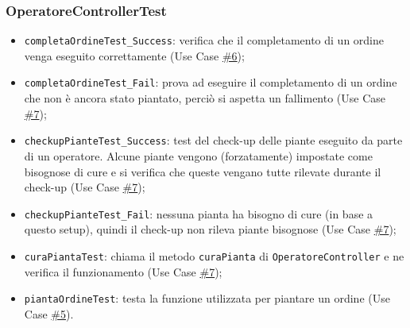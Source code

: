 \documentclass{article}
\newcommand{\code}[1]{\texttt{#1}}
\begin{document}
\subsubsection{OperatoreControllerTest}
\begin{itemize}
    \item \code{completaOrdineTest\_Success}: verifica che il completamento di un ordine venga eseguito correttamente (Use Case \hyperref[use_case_6]{\#6});
    \item \code{completaOrdineTest\_Fail}: prova ad eseguire il completamento di un ordine che non è ancora stato piantato, perciò si aspetta un fallimento (Use Case \hyperref[use_case_7]{\#7});
    \item \code{checkupPianteTest\_Success}: test del check-up delle piante eseguito da parte di un operatore. Alcune piante vengono (forzatamente) impostate come bisognose di cure e si verifica che queste vengano tutte rilevate durante il check-up (Use Case \hyperref[use_case_7]{\#7});
    \item \code{checkupPianteTest\_Fail}: nessuna pianta ha bisogno di cure (in base a questo setup), quindi il check-up non rileva piante bisognose (Use Case \hyperref[use_case_7]{\#7});
    \item \code{curaPiantaTest}: chiama il metodo \code{curaPianta} di \code{OperatoreController} e ne verifica il funzionamento (Use Case \hyperref[use_case_7]{\#7});
    \item \code{piantaOrdineTest}: testa la funzione utilizzata per piantare un ordine (Use Case \hyperref[use_case_5]{\#5}).
\end{itemize}
\end{document}
